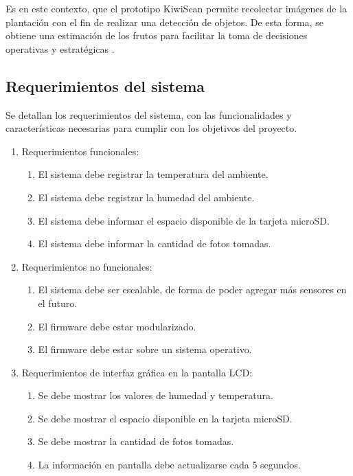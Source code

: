 Es en este contexto, que el prototipo KiwiScan permite recolectar imágenes de la plantación con el fin de realizar una detección de objetos. De esta forma, se obtiene una estimación de los frutos para facilitar la toma de decisiones operativas y estratégicas \citep{Mendoza2021}.

\subsection{Requerimientos del sistema}
\label{requerimientos_del_sistema}

Se detallan los requerimientos del sistema, con las funcionalidades y características necesarias para cumplir con los objetivos del proyecto.

\begin{enumerate}
	\item Requerimientos funcionales:
		\begin{enumerate}
			\item El sistema debe registrar la temperatura del ambiente.
			\item El sistema debe registrar la humedad del ambiente.
			\item El sistema debe informar el espacio disponible de la tarjeta microSD.
            \item El sistema debe informar la cantidad de fotos tomadas.
		\end{enumerate}
	\item Requerimientos no funcionales:
		\begin{enumerate}
			\item El sistema debe ser escalable, de forma de poder agregar más sensores en el futuro.
			\item El firmware debe estar modularizado.
            \item El firmware debe estar sobre un sistema operativo.
		\end{enumerate}
    \item Requerimientos de interfaz gráfica en la pantalla LCD:
		\begin{enumerate}
			\item Se debe mostrar los valores de humedad y temperatura.
			\item Se debe mostrar el espacio disponible en la tarjeta microSD.
            \item Se debe mostrar la cantidad de fotos tomadas.
            \item La información en pantalla debe actualizarse cada 5 segundos.
		\end{enumerate}

\end{enumerate}
